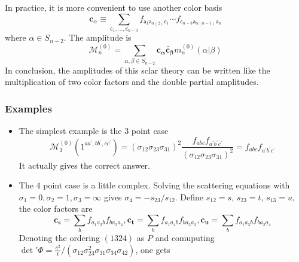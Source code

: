 \documentclass{beamer}
\begin{document}
\begin{frame}
    In practice, it is more convenient to use another color basis 
    \begin{equation*}
        \boxed{\mathbf{c}_\alpha\equiv\sum_{\mathsf{c}_1,...,\mathsf{c}_{n-3}}f_{\mathsf{a}_1\mathsf{a}_{\alpha(2)}\mathsf{c}_1}\cdots f_{\mathsf{c}_{n-3}\mathsf{a}_{\alpha(n-1)}\mathsf{a}_n}}
    \end{equation*}
    where $\alpha \in S_{n-2}$. The amplitude is 
    \begin{equation*}
        \mathcal{M}_n^{(0)}=\sum_{\alpha,\beta\in S_{n-2}}\mathbf{c_\alpha}\tilde{\mathbf{c_\beta}}m_{n}^{(0)}(\alpha|\beta)
    \end{equation*}
    In conclusion, the amplitudes of this sclar theory can be written like the multiplication of two color factors and the double partial amplitudes.
\end{frame}
\begin{frame}
    \frametitle{Examples}
    \begin{itemize}
        \item The simplest example is the 3 point case
        \begin{equation*}
            \mathcal{M}_3^{(0)}(1^{aa^\prime,bb^\prime,cc^\prime})=(\sigma_{12}\sigma_{23}\sigma_{31})^2\frac{f_{abc}f_{a^\prime b^\prime c^\prime}}{(\sigma_{12}\sigma_{23}\sigma_{31})^2}=f_{abc}f_{a^\prime b^\prime c^\prime}
        \end{equation*}
        It actually gives the correct answer.
        \pause
        \item The 4 point case is a little complex. Solving the scattering equations with $\sigma_1=0,\sigma_2=1,\sigma_3=\infty$ gives $\sigma_4=-s_{23}/s_{12}$. Define
        $s_{12}=s$, $s_{23}=t$, $s_{13}=u$, the color factors are 
        \begin{equation*}
            \mathbf{c_s}=\sum_bf_{a_1a_2b}f_{ba_3a_4},\mathbf{c_t}=\sum_bf_{a_1a_4b}f_{ba_3a_2},\mathbf{c_u}=\sum_bf_{a_1a_3b}f_{ba_2a_4}
        \end{equation*}
        Denoting the ordering $(1324)$ as $P$ and comuputing $\det{'}\Phi=\frac{s^2}{t}/(\sigma_{12}\sigma_{23}^2\sigma_{31}\sigma_{34}\sigma_{42})$, one gets
    \end{itemize}
\end{frame}
\end{document}
